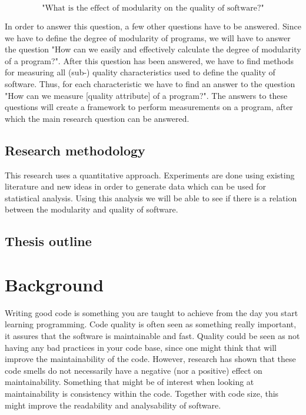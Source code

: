 \documentclass[twoside]{uva-inf-bachelor-thesis}
\begin{document}
\[ \text{"What is the effect of modularity on the quality of software?"} \]

In order to answer this question, a few other questions have to be answered. Since we have to define the degree of modularity of programs, we will have to answer the question "How can we easily and effectively calculate the degree of modularity of a program?". After this question has been answered, we have to find methods for measuring all (sub-) quality characteristics used to define the quality of software. Thus, for each characteristic we have to find an answer to the question "How can we measure [quality attribute] of a program?". The answers to these questions will create a framework to perform measurements on a program, after which the main research question can be answered.

\section{Research methodology}
This research uses a quantitative approach. Experiments are done using existing literature and new ideas in order to generate data which can be used for statistical analysis. Using this analysis we will be able to see if there is a relation between the modularity and quality of software.

\section{Thesis outline}

\chapter{Background}
Writing good code is something you are taught to achieve from the day you start learning programming. Code quality is often seen as something really important, it assures that the software is maintainable and fast. Quality could be seen as not having any bad practices in your code base, since one might think that will improve the maintainability of the code. However, research has shown that these code smells do not necessarily have a negative (nor a positive) effect on maintainability\cite{sjoberg2013quantifying}. Something that might be of interest when looking at maintainability is consistency within the code. Together with code size, this might improve the readability and analysability of software.
\end{document}
